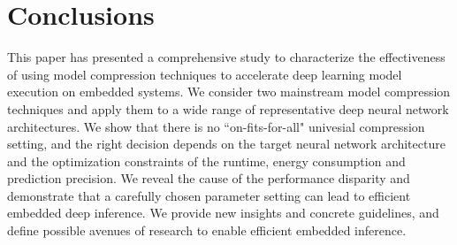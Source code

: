 \section{Conclusions}
This paper has presented a comprehensive study to characterize the effectiveness of using model compression techniques to accelerate deep
learning model execution on embedded systems. We consider two mainstream model compression techniques and apply them to a wide range of
representative deep neural network architectures. We show that there is no ``on-fits-for-all" univesial compression setting, and the right
decision depends on the target neural network architecture and the optimization constraints of the runtime, energy consumption and
prediction precision. We reveal the cause of the performance disparity and demonstrate that a carefully chosen parameter setting can lead
to efficient embedded deep inference. We provide new insights and concrete guidelines, and define possible avenues of research to enable
efficient embedded inference.
